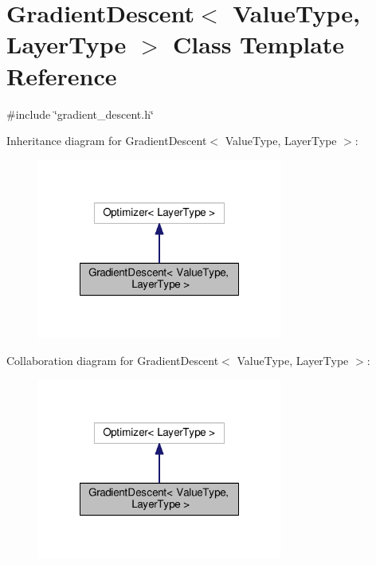 \hypertarget{class_gradient_descent}{\section{Gradient\-Descent$<$ Value\-Type, Layer\-Type $>$ Class Template Reference}
\label{class_gradient_descent}
}


{\ttfamily \#include \char`\"{}gradient\-\_\-descent.\-h\char`\"{}}



Inheritance diagram for Gradient\-Descent$<$ Value\-Type, Layer\-Type $>$\-:
\nopagebreak
\begin{figure}[H]
\begin{center}
\leavevmode
\includegraphics[width=228pt]{class_gradient_descent__inherit__graph}
\end{center}
\end{figure}


Collaboration diagram for Gradient\-Descent$<$ Value\-Type, Layer\-Type $>$\-:
\nopagebreak
\begin{figure}[H]
\begin{center}
\leavevmode
\includegraphics[width=228pt]{class_gradient_descent__coll__graph}
\end{center}
\end{figure}
